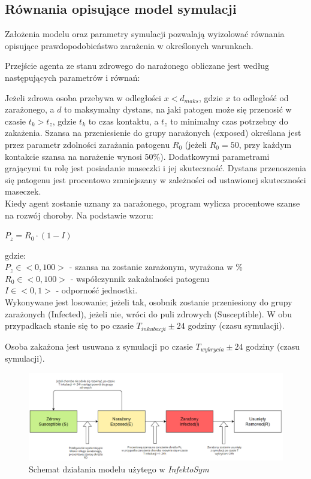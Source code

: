 \subsection{\textbf{Równania opisujące model symulacji}}
Założenia modelu oraz parametry symulacji pozwalają wyizolować równania opisujące prawdopodobieństwo zarażenia w określonych warunkach.

Przejście agenta ze stanu zdrowego do narażonego obliczane jest według następujących parametrów i równań:

Jeżeli zdrowa osoba przebywa w odległości $x < d_{maks}$, gdzie $x$ to odległość od zarażonego, a $d$ to maksymalny dystans, na jaki patogen może się przenosić w czasie $t_k > t_z$, gdzie $t_k$ to czas kontaktu, a $t_z$ to minimalny czas potrzebny do zakażenia. Szansa na przeniesienie do grupy narażonych (exposed) określana jest przez parametr zdolności zarażania patogenu $R_0$ (jeżeli $R_0 = 50$, przy każdym kontakcie szansa na narażenie wynosi 50\%).
Dodatkowymi parametrami grającymi tu rolę jest posiadanie maseczki i jej skuteczność. Dystans przenoszenia się patogenu jest procentowo zmniejszany w zależności od ustawionej skuteczności maseczek.\\

Kiedy agent zostanie uznany za narażonego, program wylicza procentowe szanse na rozwój choroby. Na podstawie wzoru:

\begin{center}
	$P_z = R_0 \cdot (1 - I)$
\end{center}

gdzie:\\
$P_z \in <0,100> $ - szansa na zostanie zarażonym, wyrażona w \% \\
$R_0 \in <0,100>$ - współczynnik zakażalności patogenu \\
$I \in <0,1>$ - odporność jednostki.\\

Wykonywane jest losowanie; jeżeli tak, osobnik zostanie przeniesiony do grupy zarażonych (Infected), jeżeli nie, wróci do puli zdrowych (Susceptible). W obu przypadkach stanie się to po czasie $T_{inkubacji} \pm 24$ godziny (czasu symulacji).

Osoba zakażona jest usuwana z symulacji po czasie $T_{wykrycia} \pm 24$ godziny (czasu symulacji).

\begin{figure}[h!]
	\includegraphics[width=\linewidth]{diagramModelu.png}
	\caption{Schemat działania modelu użytego w \textit{InfektoSym}}
\end{figure}

